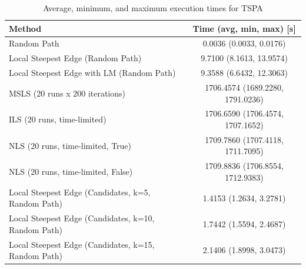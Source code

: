 \begin{table}[h!]
\centering
\begin{tabular}{lc}
\hline
Method & Time (avg, min, max) [s] \\
\hline
Random Path & 0.0036 (0.0033, 0.0176) \\
Local Steepest Edge (Random Path) & 9.7100 (8.1613, 13.9574) \\
Local Steepest Edge with LM (Random Path) & 9.3588 (6.6432, 12.3063) \\
MSLS (20 runs x 200 iterations) & 1706.4574 (1689.2280, 1791.0236) \\
ILS (20 runs, time-limited) & 1706.6590 (1706.4574, 1707.1652) \\
NLS (20 runs, time-limited, True) & 1709.7860 (1707.4118, 1711.7095) \\
NLS (20 runs, time-limited, False) & 1709.8836 (1706.8554, 1712.9383) \\
Local Steepest Edge (Candidates, k=5, Random Path) & 1.4153 (1.2634, 3.2781) \\
Local Steepest Edge (Candidates, k=10, Random Path) & 1.7442 (1.5594, 2.4687) \\
Local Steepest Edge (Candidates, k=15, Random Path) & 2.1406 (1.8998, 3.0473) \\
\hline
\end{tabular}
\caption{Average, minimum, and maximum execution times for TSPA}
\label{tab:TSPA_timings}
\end{table}
